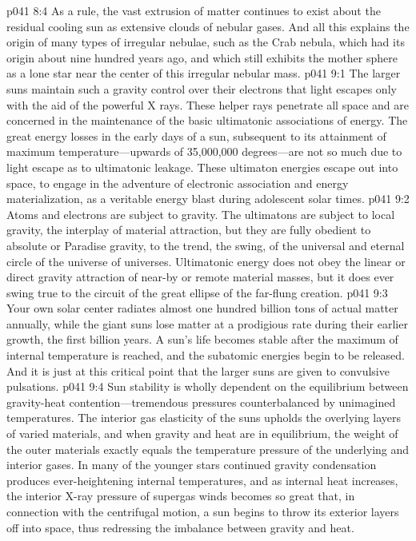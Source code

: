 \vs p041 8:4 As a rule, the vast extrusion of matter continues to exist about the residual cooling sun as extensive clouds of nebular gases. And all this explains the origin of many types of irregular nebulae, such as the Crab nebula, which had its origin about nine hundred years ago, and which still exhibits the mother sphere as a lone star near the center of this irregular nebular mass.\plusone
{}
\vs p041 9:1 The larger suns maintain such a gravity control over their electrons that light escapes only with the aid of the powerful X rays. These helper rays penetrate all space and are concerned in the maintenance of the basic ultimatonic associations of energy. The great energy losses in the early days of a sun, subsequent to its attainment of maximum temperature---upwards of 35,000,000 degrees---are not so much due to light escape as to ultimatonic leakage. These ultimaton energies escape out into space, to engage in the adventure of electronic association and energy materialization, as a veritable energy blast during adolescent solar times.\plusone
\pc \vs p041 9:2 Atoms and electrons are subject to gravity. The ultimatons are  subject to local gravity, the interplay of material attraction, but they are fully obedient to absolute or Paradise gravity, to the trend, the swing, of the universal and eternal circle of the universe of universes. Ultimatonic energy does not obey the linear or direct gravity attraction of near\hyp{}by or remote material masses, but it does ever swing true to the circuit of the great ellipse of the far\hyp{}flung creation.
\pc \vs p041 9:3 Your own solar center radiates almost one hundred billion tons of actual matter annually, while the giant suns lose matter at a prodigious rate during their earlier growth, the first billion years. A sun’s life becomes stable after the maximum of internal temperature is reached, and the subatomic energies begin to be released. And it is just at this critical point that the larger suns are given to convulsive pulsations.
\vs p041 9:4 Sun stability is wholly dependent on the equilibrium between gravity\hyp{}heat con\-ten\-tion---tremendous pressures counter\-balanced by unimagined temperatures. The interior gas elasticity of the suns upholds the overlying layers of varied materials, and when gravity and heat are in equilibrium, the weight of the outer materials exactly equals the temperature pressure of the underlying and interior gases. In many of the younger stars continued gravity condensation produces ever\hyp{}heightening internal temperatures, and as internal heat increases, the interior X\hyp{}ray pressure of supergas winds becomes so great that, in connection with the centrifugal motion, a sun begins to throw its exterior layers off into space, thus redressing the imbalance between gravity and heat.
